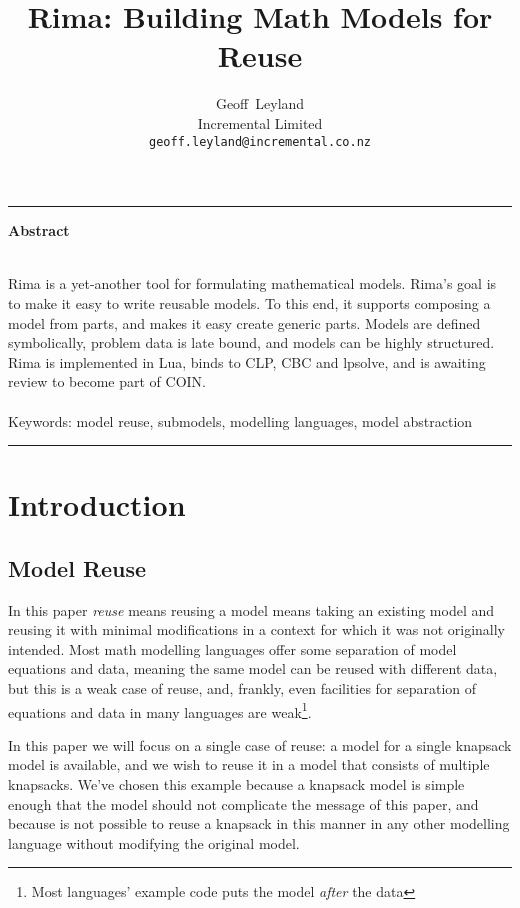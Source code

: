 \documentclass[a4paper,12pt]{article}
\title{Rima: Building Math Models for Reuse}
\author{Geoff~Leyland \\Incremental Limited\\\texttt{geoff.leyland@incremental.co.nz}}
\date{}
\begin{document}
\maketitle
\thispagestyle{empty}



\hrule\bigskip
\hfill {\Large\bf Abstract \hfill} \par\medskip
\vspace{-3ex}~\\
Rima is a yet-another tool for formulating mathematical models. Rima's goal is to make it easy to write reusable models.  To this end, it supports composing a model from parts, and makes it easy create generic parts. Models are defined symbolically, problem data is late bound, and models can be highly structured. Rima is implemented in Lua, binds to CLP, CBC and lpsolve, and is awaiting review to become part of COIN.
\\
\\
Keywords: model reuse, submodels, modelling languages, model abstraction
\bigskip\hrule



\section{Introduction}

\subsection{Model Reuse}

In this paper \emph{reuse} means reusing a model means taking an existing model and reusing it with minimal modifications in a context for which it was not originally intended.
Most math modelling languages offer some separation of model equations and data, meaning the same model can be reused with different data, but this is a weak case of reuse, and, frankly, even facilities for separation of equations and data in many languages are weak\footnote{Most languages' example code puts the model \emph{after} the data}.

In this paper we will focus on a single case of reuse:
a model for a single knapsack model is available, and we wish to reuse it in a model that consists of multiple knapsacks.
We've chosen this example because a knapsack model is simple enough that the model should not complicate the message of this paper, and because is not possible to reuse a knapsack in this manner in any other modelling language without modifying the original model.
\end{document}
